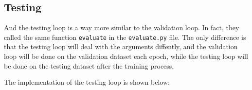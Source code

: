 \inputminted[firstline=8]{python}{../src/evaluate.py}

\subsection{Testing}

And the testing loop is a way more similar to the validation loop.
In fact, they called the same function \texttt{evaluate} in the \texttt{evaluate.py} file.
The only difference is that the testing loop will deal with the arguments diffently, and the validation loop will be done on the validation dataset each epoch, while the testing loop will be done on the testing dataset after the training process.

The implementation of the testing loop is shown below:

\inputminted[firstline=18,lastline=35]{python}{../src/inference.py}
